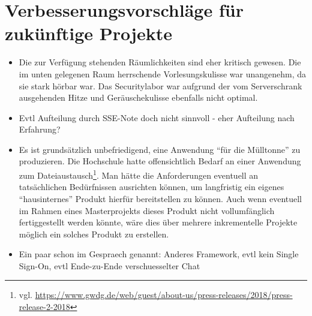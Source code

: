 \documentclass[12pt,DIV14,BCOR10mm,a4paper,parskip=half-,headsepline,headinclude,english,ngerman,bibliography=totocnumbered]{scrreprt}
\begin{document}
\chapter{Verbesserungsvorschläge für zukünftige Projekte}

\begin{itemize}
  \item Die zur Verfügung stehenden Räumlichkeiten sind eher kritisch gewesen. Die im unten gelegenen Raum herrschende Vorlesungskulisse war unangenehm, da sie stark hörbar war. Das Securitylabor war aufgrund der vom Serverschrank ausgehenden Hitze und Geräuschekulisse ebenfalls nicht optimal.
  \item Evtl Aufteilung durch SSE-Note doch nicht sinnvoll - eher Aufteilung nach Erfahrung?
  \item Es ist grundsätzlich unbefriedigend, eine Anwendung \enquote{für die Mülltonne} zu produzieren. Die Hochschule hatte offensichtlich Bedarf an einer Anwendung zum Dateiaustausch\footnote{vgl. \url{https://www.gwdg.de/web/guest/about-us/press-releases/2018/press-release-2-2018}}. Man hätte die Anforderungen eventuell an tatsächlichen Bedürfnissen ausrichten können, um langfristig ein eigenes \enquote{hausinternes} Produkt hierfür bereitstellen zu können. Auch wenn eventuell im Rahmen eines Masterprojekts dieses Produkt nicht vollumfänglich fertiggestellt werden könnte, wäre dies über mehrere inkrementelle Projekte möglich ein solches Produkt zu erstellen.
  \item Ein paar schon im Gespraech genannt: Anderes Framework, evtl kein Single Sign-On, evtl Ende-zu-Ende verschuesselter Chat
\end{itemize}

\printbibliography

\printacronyms[title=Abkürzungsverzeichnis,toctitle=Abkürzungsverzeichnis]
\printglossary[title=Glossar,toctitle=Glossar,type=main]

\iftotalfigures
  \listoffigures
\fi


\begin{appendices}

\end{appendices}
\end{document}
